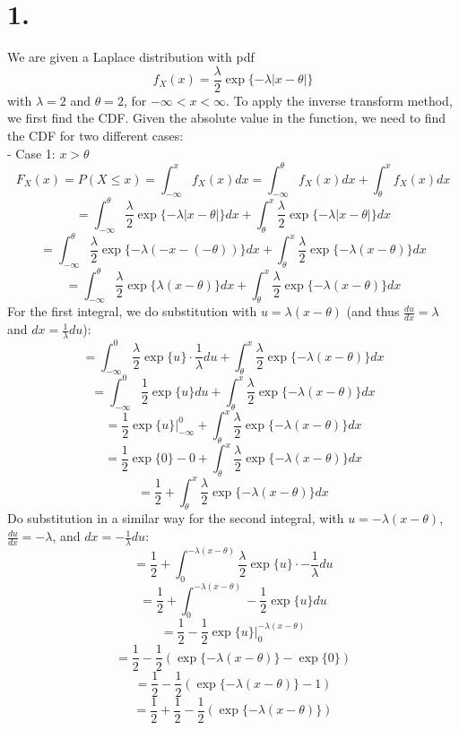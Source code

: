 \documentclass{article}
\begin{document}
\thispagestyle{firstpageheader}
{\Large 

\section*{1.}

We are given a Laplace distribution with pdf 
\[
  f_X(x) = \frac{\lambda}{2}\exp\{-\lambda|x-\theta|\}
\]
with \(\lambda = 2\) and \(\theta = 2\), for \(-\infty < x < \infty\). To apply the inverse transform method, we first find the CDF. Given the absolute value in the function, we need to find the CDF for two different cases: \\ 
- Case 1: \(x > \theta\)
\[
  F_X(x) = P(X \leq x) = \int_{-\infty}^{x} f_X(x) dx = \int_{-\infty}^{\theta} f_X(x) dx + \int_{\theta}^{x} f_X(x) dx
\]
\[
  = \int_{-\infty}^{\theta} \frac{\lambda}{2}\exp\{-\lambda|x-\theta|\} dx + \int_{\theta}^{x} \frac{\lambda}{2}\exp\{-\lambda|x-\theta|\} dx
\]
\[
  = \int_{-\infty}^{\theta} \frac{\lambda}{2}\exp\{-\lambda(-x-(-\theta))\} dx + \int_{\theta}^{x} \frac{\lambda}{2}\exp\{-\lambda(x-\theta)\} dx
\]
\[
  = \int_{-\infty}^{\theta} \frac{\lambda}{2}\exp\{\lambda(x-\theta)\} dx + \int_{\theta}^{x} \frac{\lambda}{2}\exp\{-\lambda(x-\theta)\} dx
\]
For the first integral, we do substitution with \(u = \lambda(x - \theta)\) (and thus \(\frac{du}{dx} = \lambda\) and \(dx = \frac{1}{\lambda}du\)):
\[
  = \int_{-\infty}^{0} \frac{\lambda}{2}\exp\{u\} \cdot \frac{1}{\lambda} du + \int_{\theta}^{x} \frac{\lambda}{2}\exp\{-\lambda(x-\theta)\} dx 
\]
\[
  = \int_{-\infty}^{0} \frac{1}{2}\exp\{u\} du + \int_{\theta}^{x} \frac{\lambda}{2}\exp\{-\lambda(x-\theta)\} dx 
\]
\[
  = \frac{1}{2}\exp\{u\} |_{-\infty}^{0}  + \int_{\theta}^{x} \frac{\lambda}{2}\exp\{-\lambda(x-\theta)\} dx 
\]
\[
  = \frac{1}{2}\exp\{0\} - 0 + \int_{\theta}^{x} \frac{\lambda}{2}\exp\{-\lambda(x-\theta)\} dx 
\]
\[
  = \frac{1}{2} + \int_{\theta}^{x} \frac{\lambda}{2}\exp\{-\lambda(x-\theta)\} dx 
\]
Do substitution in a similar way for the second integral, with \(u = -\lambda(x - \theta)\), \(\frac{du}{dx} = -\lambda\), and \(dx = -\frac{1}{\lambda}du\):
\[
  = \frac{1}{2} + \int_{0}^{-\lambda(x - \theta)} \frac{\lambda}{2}\exp\{u\} \cdot -\frac{1}{\lambda} du
\]
\[
  = \frac{1}{2} + \int_{0}^{-\lambda(x - \theta)} -\frac{1}{2}\exp\{u\} du
\]
\[
  = \frac{1}{2} - \frac{1}{2}\exp\{u\} |_{0}^{-\lambda(x - \theta)}
\]
\[
  = \frac{1}{2} - \frac{1}{2}(\exp\{-\lambda(x - \theta)\} - \exp\{0\})
\]
\[
  = \frac{1}{2} - \frac{1}{2}(\exp\{-\lambda(x - \theta)\} - 1)
\]
\[
  = \frac{1}{2} + \frac{1}{2} - \frac{1}{2}(\exp\{-\lambda(x - \theta)\})
\]}
\end{document}
